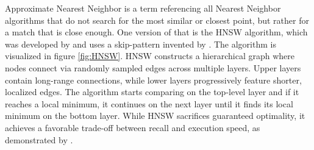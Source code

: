 Approximate Nearest Neighbor is a term referencing all Nearest Neighbor algorithms that do not search for the most similar or closest point, but rather for a match that is close enough. One version of that is the HNSW algorithm, which was developed by \cite{Malkov.2014} and uses a skip-pattern invented by \cite{Pugh.1990}. The algorithm is visualized in figure \ref{fig:HNSW}. HNSW constructs a hierarchical graph where nodes connect via randomly sampled edges across multiple layers. Upper layers contain long-range connections, while lower layers progressively feature shorter, localized edges. The algorithm starts comparing on the top-level layer and if it reaches a local minimum, it continues on the next layer until it finds its local minimum on the bottom layer. While HNSW sacrifices guaranteed optimality, it achieves a favorable trade-off between recall and execution speed, as demonstrated by \cite{ErikBernhardsson.22.01.2025}.
